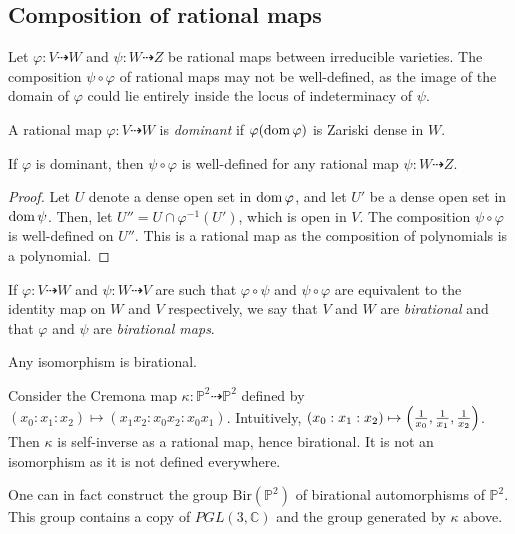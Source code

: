 \subsection{Composition of rational maps}
Let \( \varphi \colon V \dashrightarrow W \) and \( \psi \colon W \dashrightarrow Z \) be rational maps between irreducible varieties.
The composition \( \psi \circ \varphi \) of rational maps may not be well-defined, as the image of the domain of \( \varphi \) could lie entirely inside the locus of indeterminacy of \( \psi \).
\begin{definition}
    A rational map \( \varphi \colon V \dashrightarrow W \) is \emph{dominant} if \( \varphi(\operatorname{dom} \varphi) \) is Zariski dense in \( W \).
\end{definition}
\begin{proposition}
    If \( \varphi \) is dominant, then \( \psi \circ \varphi \) is well-defined for any rational map \( \psi \colon W \dashrightarrow Z \).
\end{proposition}
\begin{proof}
    Let \( U \) denote a dense open set in \( \operatorname{dom} \varphi \), and let \( U' \) be a dense open set in \( \operatorname{dom} \psi \).
    Then, let \( U'' = U \cap \varphi^{-1}(U') \), which is open in \( V \).
    The composition \( \psi \circ \varphi \) is well-defined on \( U'' \).
    This is a rational map as the composition of polynomials is a polynomial.
\end{proof}
If \( \varphi \colon V \dashrightarrow W \) and \( \psi \colon W \dashrightarrow V \) are such that \( \varphi \circ \psi \) and \( \psi \circ \varphi \) are equivalent to the identity map on \( W \) and \( V \) respectively, we say that \( V \) and \( W \) are \emph{birational} and that \( \varphi \) and \( \psi \) are \emph{birational maps}.
\begin{example}
    Any isomorphism is birational.
\end{example}
\begin{example}
    Consider the Cremona map \( \kappa \colon \mathbb P^2 \dashrightarrow \mathbb P^2 \) defined by \( (x_0 : x_1 : x_2) \mapsto (x_1 x_2 : x_0 x_2 : x_0 x_1) \).
    Intuitively, \( (x_0 : x_1 : x_2) \mapsto \qty(\frac{1}{x_0}, \frac{1}{x_1}, \frac{1}{x_2}) \).
    Then \( \kappa \) is self-inverse as a rational map, hence birational.
    It is not an isomorphism as it is not defined everywhere.
\end{example}
\begin{remark}
    One can in fact construct the group \( \mathrm{Bir}(\mathbb P^2) \) of birational automorphisms of \( \mathbb P^2 \).
    This group contains a copy of \( PGL(3, \mathbb C) \) and the group generated by \( \kappa \) above.
\end{remark}
